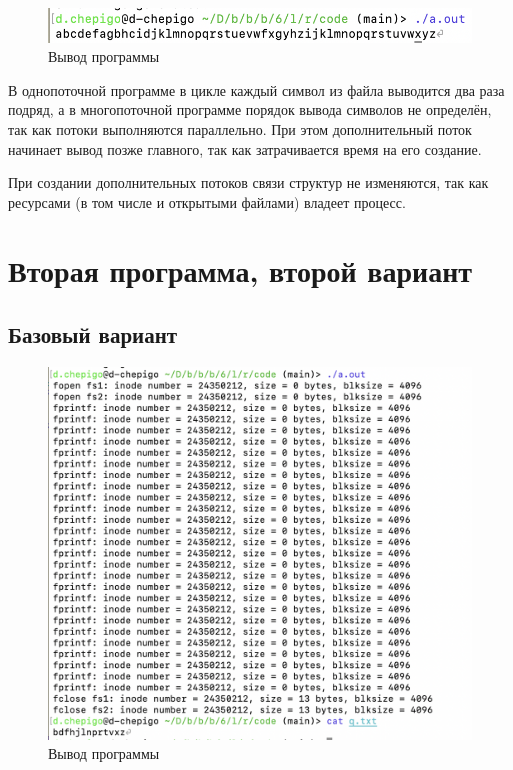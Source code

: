 \begin{figure}[!hbpt]
	\centering
	\includegraphics[width=\textwidth]{image/2-2}
	\caption{Вывод программы}
\end{figure}


В однопоточной программе в цикле каждый символ из файла выводится два раза подряд, а в многопоточной программе порядок вывода символов не определён, так как потоки выполняются параллельно. При этом дополнительный поток начинает вывод позже главного, так как затрачивается время на его создание.

При создании дополнительных потоков связи структур не изменяются, так как ресурсами (в том числе и открытыми файлами) владеет процесс.

\newpage
\section{Вторая программа, второй вариант}

\subsection{Базовый вариант}

\begin{figure}[h]
	\centering
	\includegraphics[width=\textwidth]{image/22-1}
	\caption{Вывод программы}
\end{figure}

